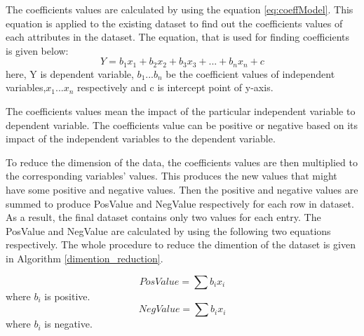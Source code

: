 \documentclass[12pt]{report}
\begin{document}
The coefficients values are calculated by using the equation \ref{eq:coeffModel}. This equation is applied to the existing dataset to find out the coefficients values of each attributes in the dataset. The equation, that is used for finding coefficients is given below:   
\begin{equation}
\label{eq:coeffModel}
 Y=b_{1}x_{1}+b_{2}x_{2}+b_{3}x_{3}+...+b_{n}x_{n}+c
\end{equation}
here, Y is dependent variable, $b_{1}$...$b_{n}$ be the coefficient values of independent variables,$x_{1}$...$x{_n}$ respectively and c is intercept point of y-axis. 

 The coefficients values mean the impact of the particular independent variable to dependent variable. The coefficients value can be positive or negative based on its impact of the independent variables to the dependent variable. 
 
To reduce the dimension of the data, the coefficients values are then multiplied to the corresponding variables' values. This produces the new values that might have some positive and negative values. Then the positive and negative values are summed to produce PosValue and NegValue respectively for each row in dataset. As a result, the final dataset contains only two values for each entry. The PosValue and NegValue are calculated by using the following two equations respectively. The whole procedure to reduce the dimention of the dataset is given in Algorithm \ref{dimention_reduction}.

\begin{equation}
\label{eq:PosValue}
 PosValue=\sum{b_{i}x_{i}}
\end{equation} 
where $b_{i}$ is positive.
\begin{equation}
\label{eq:NegValue}
NegValue=\sum{b_{i}x_{i}}
\end{equation}
where $b_{i}$ is negative.



%
%
\end{document}
